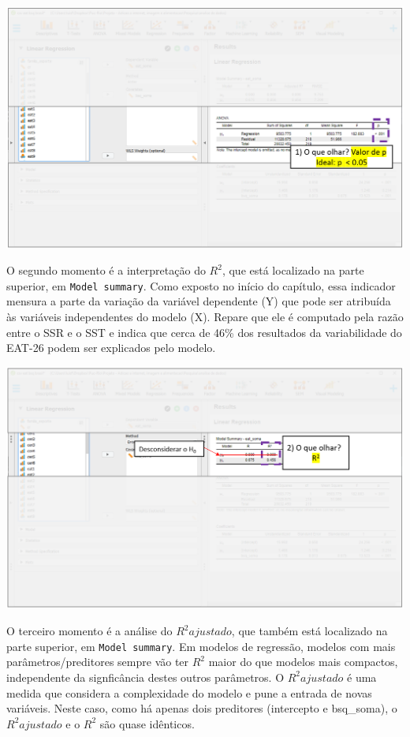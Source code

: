 \documentclass[
]{book}
\begin{document}
\includegraphics{./img/cap_reg_resultados1.png}

O segundo momento é a interpretação do \(R^2\), que está localizado na parte superior, em \texttt{Model\ summary}. Como exposto no início do capítulo, essa indicador mensura a parte da variação da variável dependente (Y) que pode ser atribuída às variáveis independentes do modelo (X). Repare que ele é computado pela razão entre o SSR e o SST e indica que cerca de 46\% dos resultados da variabilidade do EAT-26 podem ser explicados pelo modelo.

\includegraphics{./img/cap_reg_resultados2.png}

O terceiro momento é a análise do \(R^2 ajustado\), que também está localizado na parte superior, em \texttt{Model\ summary}. Em modelos de regressão, modelos com mais parâmetros/preditores sempre vão ter \(R^2\) maior do que modelos mais compactos, independente da signficância destes outros parâmetros. O \(R^2 ajustado\) é uma medida que considera a complexidade do modelo e pune a entrada de novas variáveis. Neste caso, como há apenas dois preditores (intercepto e bsq\_soma), o \(R^2 ajustado\) e o \(R^2\) são quase idênticos.
\end{document}

